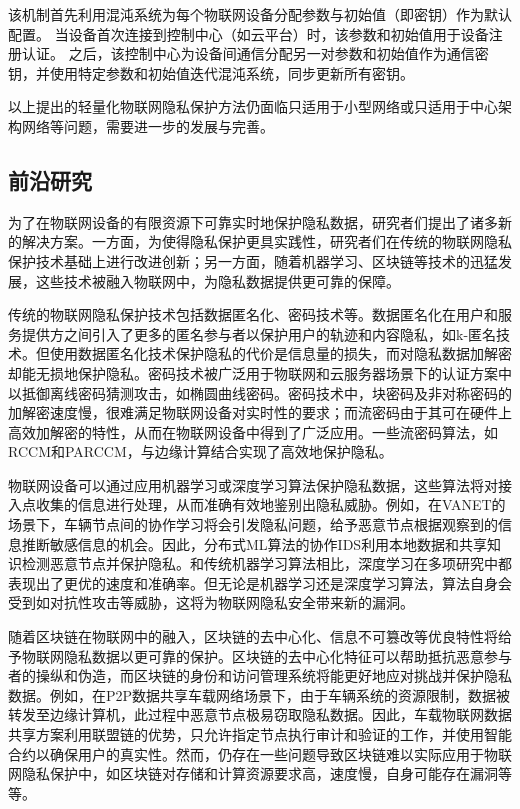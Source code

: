 该机制首先利用混沌系统为每个物联网设备分配参数与初始值（即密钥）作为默认配置。
当设备首次连接到控制中心（如云平台）时，该参数和初始值用于设备注册认证。
之后，该控制中心为设备间通信分配另一对参数和初始值作为通信密钥，并使用特定参数和初始值迭代混沌系统，同步更新所有密钥\cite{luo}。


以上提出的轻量化物联网隐私保护方法仍面临只适用于小型网络或只适用于中心架构网络等问题，需要进一步的发展与完善。

\subsection{前沿研究}
\label{recentwork}

为了在物联网设备的有限资源下可靠实时地保护隐私数据，研究者们提出了诸多新的解决方案。一方面，为使得隐私保护更具实践性，研究者们在传统的物联网隐私保护技术基础上进行改进创新；另一方面，随着机器学习、区块链等技术的迅猛发展，这些技术被融入物联网中，为隐私数据提供更可靠的保障。

传统的物联网隐私保护技术包括数据匿名化、密码技术等。数据匿名化在用户和服务提供方之间引入了更多的匿名参与者以保护用户的轨迹和内容隐私，如k-匿名技术\cite{Zhang2017}。但使用数据匿名化技术保护隐私的代价是信息量的损失，而对隐私数据加解密却能无损地保护隐私。密码技术被广泛用于物联网和云服务器场景下的认证方案中以抵御离线密码猜测攻击，如椭圆曲线密码\cite{Kumari2018}。密码技术中，块密码及非对称密码的加解密速度慢，很难满足物联网设备对实时性的要求；而流密码由于其可在硬件上高效加解密的特性，从而在物联网设备中得到了广泛应用。一些流密码算法，如RCCM和PARCCM\cite{Liu2020}，与边缘计算结合实现了高效地保护隐私。

物联网设备可以通过应用机器学习或深度学习算法保护隐私数据，这些算法将对接入点收集的信息进行处理，从而准确有效地鉴别出隐私威胁。例如，在VANET的场景下，车辆节点间的协作学习将会引发隐私问题，给予恶意节点根据观察到的信息推断敏感信息的机会。因此，分布式ML算法的协作IDS\cite{Tao2018}利用本地数据和共享知识检测恶意节点并保护隐私。和传统机器学习算法相比，深度学习在多项研究中都表现出了更优的速度和准确率。但无论是机器学习还是深度学习算法，算法自身会受到如对抗性攻击等威胁，这将为物联网隐私安全带来新的漏洞。


随着区块链在物联网中的融入，区块链的去中心化、信息不可篡改等优良特性将给予物联网隐私数据以更可靠的保护。区块链的去中心化特征可以帮助抵抗恶意参与者的操纵和伪造，而区块链的身份和访问管理系统将能更好地应对挑战并保护隐私数据\cite{Kshetri2017}。例如，在P2P数据共享车载网络场景下，由于车辆系统的资源限制，数据被转发至边缘计算机，此过程中恶意节点极易窃取隐私数据。因此，车载物联网数据共享方案\cite{Kang2018}利用联盟链的优势，只允许指定节点执行审计和验证的工作，并使用智能合约以确保用户的真实性。然而，仍存在一些问题导致区块链难以实际应用于物联网隐私保护中，如区块链对存储和计算资源要求高，速度慢，自身可能存在漏洞等等。
